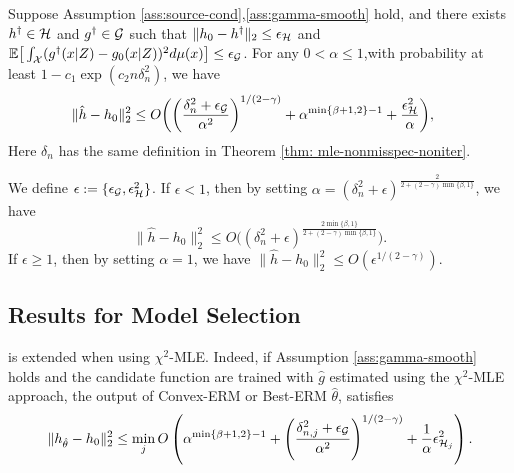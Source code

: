 \begin{theorem}\label{thm: chi2mle-misspec}
    Suppose Assumption \ref{ass:source-cond},\ref{ass:gamma-smooth} hold, and there exists $h^{\dag}\in \mathcal{H}$ and $g^{\dag} \in \mathcal{G}$ such that $\|h_0 - h^{\dag}\|_2 \leq \epsilon_{\mathcal{H}}$ and $\mathbb{E}\big[\int_{\mathcal{X}} (g^{\dag}(x|Z) - g_0(x|Z)  )^2 d \mu(x)\big] \leq \epsilon_{\mathcal{G}}$. For any $0<\alpha\leq 1$,with probability at least $1- c_1\exp(c_2n\delta_n^2)$, we have \begin{align*}
    &\|\hat{h} - h_0\|_2^2\leq O\bigg( \bigg(\frac{\delta_n^2+\epsilon_{\mathcal{G}}}{\alpha^2} \bigg)^{1/(2-\gamma)} + \alpha^{\min\{\beta+1,2\}-1}+\frac{\epsilon_{\mathcal{H}}^2}{\alpha}\bigg),
    \end{align*}
    Here $\delta_n$ has the same definition in Theorem \ref{thm: mle-nonmisspec-noniter}. 
\end{theorem}
\begin{remark}
    We define $\epsilon:= \{\epsilon_{\mathcal{G}},\epsilon_{\mathcal{H}}^2 \}$. If $\epsilon < 1$, then by setting $\alpha = (\delta_n^2 + \epsilon)^{\frac{2}{2+(2-\gamma)\min\{\beta,1\}}}$, we have $$
    \|\hat{h} - h_0\|_2^2 \leq O\big((\delta_n^2 + \epsilon)^{\frac{2\min\{\beta,1\}}{2+(2-\gamma)\min\{\beta,1\}}}\big).
    $$
    If $\epsilon \geq 1$, then by setting $\alpha = 1$, we have $\|\hat{h} - h_0\|_2^2 \leq O(\epsilon^{1/(2-\gamma)})$.
    
\end{remark}
\subsection{Results for Model Selection}


 is extended when using $\chi^2$-MLE. Indeed, if Assumption \ref{ass:gamma-smooth} holds and the candidate function are trained with $\hat{g}$ estimated using the $\chi^2$-MLE approach, the output of Convex-ERM or Best-ERM $\hat{\theta}$, satisfies
    \begin{align*}
    \|h_{\hat{\theta}} - h_0\|_2^2 \leq \min_{j}O\left(\alpha^{\min\{\beta+1,2\}-1} + \left(\frac{\delta_{n,j}^2+\epsilon_{\mathcal{G}}}{\alpha^2} \right)^{1/(2-\gamma)} + \frac{1}{\alpha} \epsilon_{\mathcal{H}_j}^2\right). 
\end{align*}

